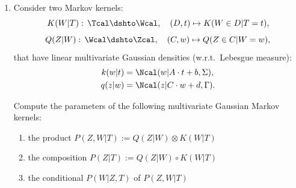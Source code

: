 \begin{enumerate}
\begin{ungradedsolution}
\begin{enumerate}
\begin{align*}
      \end{align*}
      so $f_m = f_2$.
      \item Let $\delta_{f_{cd}}(Y|X, T): \Xcal\times \Tcal \dshto \Ycal$ be the conditional Markov kernel such that
      \begin{equation}\label{foo}
        \delta_{f_p}(X, Y|T) = \delta_{f_{cd}}(Y|X, T) \otimes \delta_{f_m}(X|T).
      \end{equation}
      Then, for all $A\in \Bcal_\Xcal$, $B\in\Bcal_\Ycal$ and $t\in\Tcal$ we have
      \begin{align*}
        [\delta_{f_3}(Y|T)\otimes \delta_{f_2}(X|T)](B\times A, t)
         & = [\delta_{f_2}(X|T)\otimes \delta_{f_3}(Y|T)](A\times B, t)        & \text{Fubini}             \\
         & = \delta_{f_p}(X, Y|T)(A\times B, t)                                & \text{(b)}                \\
         & = [\delta_{f_{cd}}(Y|X, T) \otimes \delta_{f_m}(X|T)](B\times A, t) & \text{eqn.\ (\ref*{foo})} \\
         & = [\delta_{f_{cd}}(Y|X, T) \otimes \delta_{f_2}(X|T)](B\times A, t) & \text{(c)}
      \end{align*}
      and so for $f_{cd} = f_3$, by Lemma \ref*{ess-unique} we have that $\delta_{f_{cd}} = \delta_{f_3}$ up to $\delta_{f_m}(X|T)$-null sets.

    \end{enumerate}
  \end{ungradedsolution}

  \item %
  Consider two Markov kernels:
  \[K(W|T):\, \Tcal \dshto \Wcal,\quad (D,t) \mapsto K(W \in D|T=t),  \]
  \[Q(Z|W):\, \Wcal \dshto \Zcal,\quad (C,w) \mapsto Q(Z \in C|W=w),  \]
  that have linear multivariate Gaussian densities (w.r.t.\ Lebesgue measure):
  \begin{align*}
    k(w|t) & = \Ncal(w|A \cdot t +b, \Sigma),   \\
    q(z|w) & = \Ncal(z| C \cdot w + d, \Gamma).
  \end{align*}

  Compute the parameters of the following multivariate Gaussian Markov kernels:
  \begin{enumerate}
    \item the product $P(Z, W|T):=Q(Z|W) \otimes K(W|T)$
    \item the composition $P(Z|T):=Q(Z|W) \circ K(W|T)$
    \item the conditional $P(W|Z, T)$ of $P(Z, W|T)$
  \end{enumerate}


\end{enumerate}
